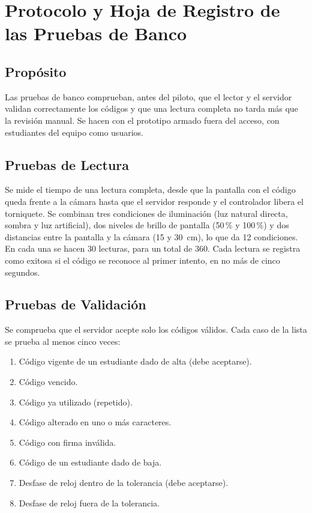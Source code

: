 \section{Protocolo y Hoja de Registro de las Pruebas de Banco}

\subsection{Propósito}
Las pruebas de banco comprueban, antes del piloto, que el lector y el
servidor validan correctamente los códigos y que una lectura completa no
tarda más que la revisión manual. Se hacen con el prototipo armado fuera del
acceso, con estudiantes del equipo como usuarios.

\subsection{Pruebas de Lectura}
Se mide el tiempo de una lectura completa, desde que la pantalla con el
código queda frente a la cámara hasta que el servidor responde y el
controlador libera el torniquete. Se combinan tres condiciones de
iluminación (luz natural directa, sombra y luz artificial), dos niveles de
brillo de pantalla (50\,\% y 100\,\%) y dos distancias entre la pantalla y la
cámara (15 y 30~cm), lo que da 12 condiciones. En cada una se hacen 30
lecturas, para un total de 360. Cada lectura se registra como exitosa si
el código se reconoce al primer intento, en no más de cinco segundos.

\subsection{Pruebas de Validación}
Se comprueba que el servidor acepte solo los códigos válidos. Cada caso de la
lista se prueba al menos cinco veces:
\begin{enumerate}
	\item Código vigente de un estudiante dado de alta (debe aceptarse).
	\item Código vencido.
	\item Código ya utilizado (repetido).
	\item Código alterado en uno o más caracteres.
	\item Código con firma inválida.
	\item Código de un estudiante dado de baja.
	\item Desfase de reloj dentro de la tolerancia (debe aceptarse).
	\item Desfase de reloj fuera de la tolerancia.
\end{enumerate}

